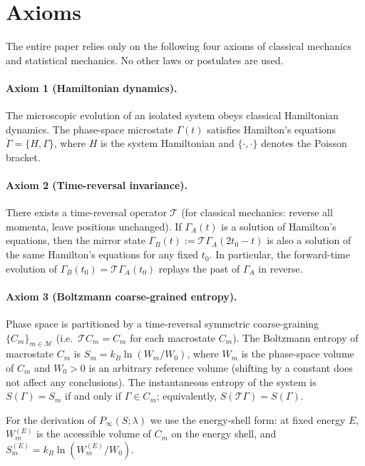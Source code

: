\documentclass[11pt,a4paper]{article}
\begin{document}
\section{Axioms}
\label{sec:prelim}

The entire paper relies only on the following four axioms of classical mechanics
and statistical mechanics. No other laws or postulates are used.

\paragraph{Axiom 1 (Hamiltonian dynamics).}
The microscopic evolution of an isolated system obeys classical Hamiltonian dynamics.
The phase-space microstate $\Gamma(t)$ satisfies Hamilton's equations
$\dot{\Gamma}=\{H,\Gamma\}$, where $H$ is the system Hamiltonian and
$\{\cdot,\cdot\}$ denotes the Poisson bracket.

\paragraph{Axiom 2 (Time-reversal invariance).}
There exists a time-reversal operator $\mathcal{T}$ (for classical mechanics:
reverse all momenta, leave positions unchanged). If $\Gamma_A(t)$ is a solution of
Hamilton's equations, then the mirror state
$\Gamma_B(t):=\mathcal{T}\Gamma_A(2t_0-t)$ is also a solution of the same
Hamilton's equations for any fixed $t_0$. In particular, the forward-time
evolution of $\Gamma_B(t_0)=\mathcal{T}\Gamma_A(t_0)$ replays the past of
$\Gamma_A$ in reverse.

\paragraph{Axiom 3 (Boltzmann coarse-grained entropy).}
Phase space is partitioned by a time-reversal symmetric coarse-graining
$\{C_m\}_{m\in\mathcal{M}}$ (i.e.\ $\mathcal{T}C_m=C_m$ for each macrostate
$C_m$). The Boltzmann entropy of macrostate $C_m$ is
$S_m=k_B\ln(W_m/W_0)$, where $W_m$ is the phase-space volume of $C_m$ and
$W_0>0$ is an arbitrary reference volume (shifting by a constant does not affect
any conclusions). The instantaneous entropy of the system is
$S(\Gamma)=S_m$ if and only if $\Gamma\in C_m$; equivalently,
$S(\mathcal{T}\Gamma)=S(\Gamma)$.

For the derivation of $P_{\infty}(S;\lambda)$ we use the energy-shell form: at
fixed energy $E$, $W_m^{(E)}$ is the accessible volume of $C_m$ on the energy
shell, and $S_m^{(E)}=k_B\ln(W_m^{(E)}/W_0)$.
\end{document}
